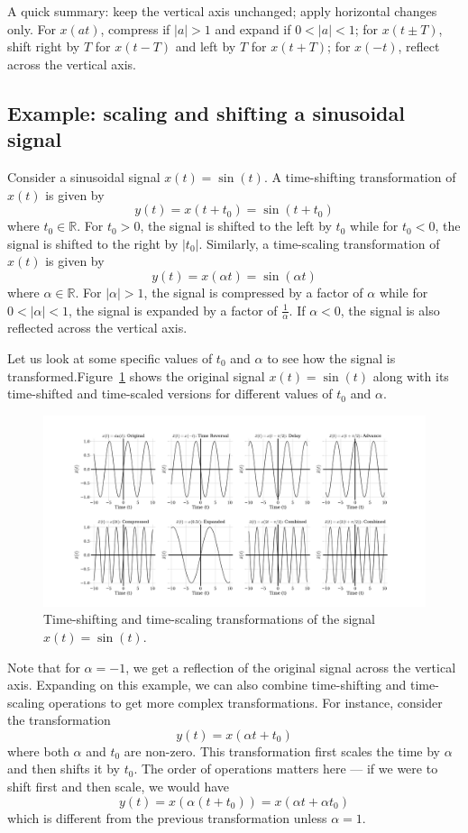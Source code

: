\documentclass{ee102_notes}
\begin{document}
A quick summary: keep the vertical axis unchanged; apply horizontal changes only. For $x(at)$, compress if $|a|>1$ and expand if $0<|a|<1$; for $x(t\pm T)$, shift right by $T$ for $x(t-T)$ and left by $T$ for $x(t+T)$; for $x(-t)$, reflect across the vertical axis.

\subsection*{Example: scaling and shifting a sinusoidal signal}
Consider a sinusoidal signal $x(t) = \sin(t)$. A time-shifting transformation of $x(t)$ is given by
\[
y(t) = x(t + t_0) = \sin(t + t_0)
\]
where $t_0 \in \mathbb{R}$. For $t_0 > 0$, the signal is shifted to the left by $t_0$ while for $t_0 < 0$, the signal is shifted to the right by $|t_0|$. Similarly, a time-scaling transformation of $x(t)$ is given by
\[
y(t) = x(\alpha t) = \sin(\alpha t)
\]
where $\alpha \in \mathbb{R}$. For $|\alpha| > 1$, the signal is compressed by a factor of $\alpha$ while for $0 < |\alpha| < 1$, the signal is expanded by a factor of $\frac{1}{\alpha}$. If $\alpha < 0$, the signal is also reflected across the vertical axis.

Let us look at some specific values of $t_0$ and $\alpha$ to see how the signal is transformed.Figure~\ref{fig:week2_sin} shows the original signal $x(t) = \sin(t)$ along with its time-shifted and time-scaled versions for different values of $t_0$ and $\alpha$.
\begin{figure}[h]
    \centering
    \includegraphics[width=\linewidth]{figs/signal_transformations.png}
    \caption{Time-shifting and time-scaling transformations of the signal $x(t) = \sin(t)$.}
    \label{fig:week2_sin}
\end{figure}
Note that for $\alpha = -1$, we get a reflection of the original signal across the vertical axis. Expanding on this example, we can also combine time-shifting and time-scaling operations to get more complex transformations. For instance, consider the transformation
\[
y(t) = x(\alpha t + t_0)
\]
where both $\alpha$ and $t_0$ are non-zero. This transformation first scales the time by $\alpha$ and then shifts it by $t_0$. The order of operations matters here --- if we were to shift first and then scale, we would have
\[
y(t) = x(\alpha (t + t_0)) = x(\alpha t + \alpha t_0)
\]
which is different from the previous transformation unless $\alpha = 1$.
\end{document}
